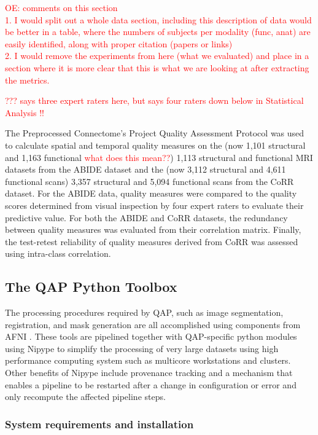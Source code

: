 \documentclass{frontiersSCNS} %
\newcommand\ccnotes[1]{\textcolor{red}{#1}}
\begin{document}
\ccnotes{OE: comments on this section\\
1. I would split out a whole data section, including this description of data would be better in a table, where the numbers of subjects per modality (func, anat) are easily identified, along with proper citation (papers or links)\\
2. I would remove the experiments from here (what we evaluated) and place in a section where it is more clear that this is what we are looking at after extracting the metrics.}

\ccnotes{??? says three expert raters here, but says four raters down below in Statistical Analysis !!}

The Preprocessed Connectome’s Project Quality Assessment Protocol was used to calculate spatial and temporal quality measures on the (now 1,101 structural and 1,163 functional \ccnotes{what does this mean??}) 1,113 structural and functional MRI datasets from the ABIDE dataset and the (now 3,112 structural and 4,611 functional scans) 3,357 structural and 5,094 functional scans from the CoRR dataset. For the ABIDE data, quality measures were compared to the quality scores determined from visual inspection by four expert raters to evaluate their predictive value. For both the ABIDE and CoRR datasets, the redundancy between quality measures was evaluated from their correlation matrix. Finally, the test-retest reliability of quality measures derived from CoRR was assessed using intra-class correlation.

\subsection{The QAP Python Toolbox}
\label{sec:19}

The processing procedures required by QAP, such as image segmentation, registration, and mask generation are all accomplished using components from AFNI \citep{cox1996}. These tools are pipelined together with QAP-specific python modules using Nipype \citep{gorgolewski_2016_50186} to simplify the processing of very large datasets using high performance computing system such as multicore workstations and clusters. Other benefits of Nipype include provenance tracking and a mechanism that enables a pipeline to be restarted after a change in configuration or error and only recompute the affected pipeline steps. 

\subsubsection{System requirements and installation}
\end{document}
